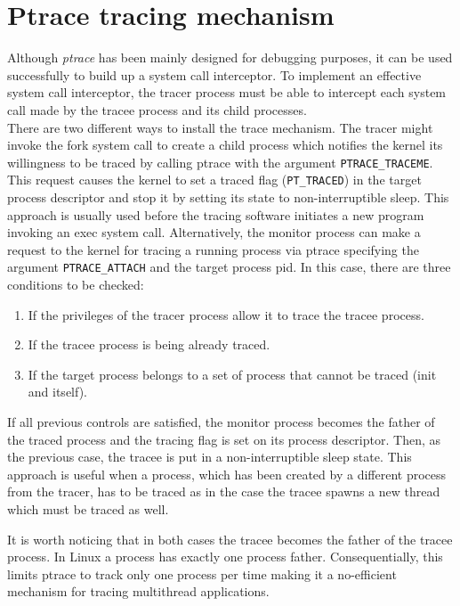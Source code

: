 \section{Ptrace tracing mechanism}
\label{Ptrace_tracing_mechanism}
Although \emph{ptrace} has been mainly designed for debugging purposes, it can be used successfully to build up a system call interceptor. To implement an effective system call interceptor, the tracer process must be able to intercept each system call made by the tracee process and its child processes.\\
There are two different ways to install the trace mechanism. The tracer might invoke the fork system call to create a child process which notifies the kernel its willingness to be traced by calling ptrace with the argument \lstinline$PTRACE_TRACEME$. This request causes the kernel to set a traced flag (\lstinline$PT_TRACED$) in the target process descriptor and stop it by setting its state to non-interruptible sleep. This approach is usually used before the tracing software initiates a new program invoking an exec system call. Alternatively, the monitor process can make a request to the kernel for tracing a running process via ptrace specifying the argument \lstinline$PTRACE_ATTACH$ and the target process pid. In this case, there are three conditions to be checked:
\begin{enumerate}
\item If the privileges of the tracer process allow it to trace the tracee process. 
\item If the tracee process is being already traced.
\item If the target process belongs to a set of process that cannot be traced (init and itself).
\end{enumerate}

If all previous controls are satisfied, the monitor process becomes the father of the traced process and the tracing flag is set on its process descriptor. Then, as the previous case, the tracee is put in a non-interruptible sleep state.  This approach is useful when a process, which has been created by a different process from the tracer, has to be traced as in the case the tracee spawns a new thread which must be traced as well. 

It is worth noticing that in both cases the tracee becomes the father of the tracee process. In Linux a process has exactly one process father. Consequentially, this limits ptrace to track only one process per time making it a no-efficient mechanism for tracing multithread applications. 


